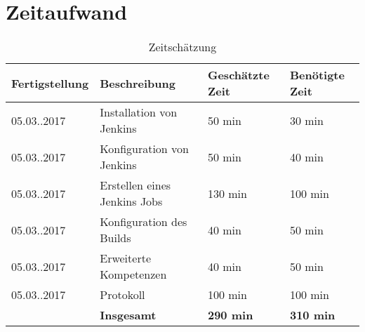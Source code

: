 \section{Zeitaufwand}
\renewcommand{\arraystretch}{1.5}
\begin{table}[!h]
	\center
	\begin{tabular}{ |l|l|l|l| }
		\hline
		\textbf{Fertigstellung} & \textbf{Beschreibung} & \textbf{Geschätzte Zeit} & \textbf{Benötigte Zeit}\\ \hline \hline
		05.03..2017 & Installation von Jenkins & 50 min & 30 min\\ \hline
		05.03..2017 & Konfiguration von Jenkins & 50 min & 40 min\\ \hline
		05.03..2017 & Erstellen eines Jenkins Jobs & 130 min & 100 min\\ \hline
		05.03..2017  & Konfiguration des Builds& 40 min & 50 min\\ \hline
		05.03..2017  & Erweiterte Kompetenzen& 40 min & 50 min\\ \hline
		05.03..2017  & Protokoll & 100 min & 100 min\\ \hline \hline
		& \textbf{Insgesamt} & \textbf{290 min} & \textbf{310 min} \\ \hline
	\end{tabular}
	\caption{Zeitschätzung}
	\label{methoden}
\end{table}


\clearpage